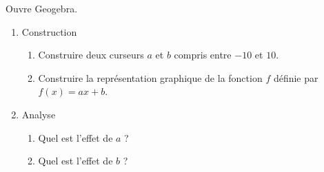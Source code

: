 
Ouvre Geogebra.
\begin{enumerate}
\item Construction
	\begin{enumerate}
	\item Construire deux curseurs $a$ et $b$ compris entre $-10$ et $10$.
	\item Construire la représentation graphique de la fonction $f$ définie par $f(x)=ax+b$.
	\end{enumerate}
\item Analyse	
	\begin{enumerate}
	\item Quel est l'effet de $a$ ?
	\item Quel est l'effet de $b$ ?
	\end{enumerate}
\end{enumerate}
